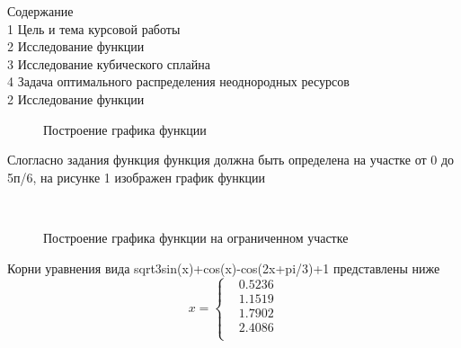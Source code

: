 \documentclass[russian,utf8,nocolumnxxxi,nocolumnxxxii]{eskdtext}
\begin{document}
\maketitle
Содержание\\

1 Цель и тема курсовой работы\\

2 Исследование функции\\

3 Исследование кубического сплайна\\

4 Задача оптимального распределения неоднородных ресурсов\\



2 Исследование функции\\
\begin{figure}[!ht]
    \centering
{} 
    \caption{Построение графика функции}
    \label{fig:my_label}
\end{figure}
Слогласно задания функция функция должна быть определена на участке от 0 до 5п/6, на рисунке 1 изображен график функции\\
\begin{figure}[!ht]
    \centering
{}\\
\caption{Построение графика функции на ограниченном участке}
    \label{fig:my_label}
\end{figure}
Корни уравнения вида sqrt3sin(x)+cos(x)-cos(2x+pi/3)+1 представлены ниже\\
\begin{equation}
x=\left\{
\begin{array}{cc}
    &0.5236 \\
    &1.1519 \\
    &1.7902 \\
    &2.4086 \\
\end{array}
\right.
\end{equation}
\end{document}
